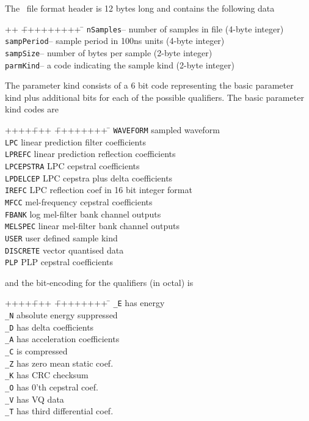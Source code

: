The \HTK\ file format header is 12 bytes long and contains the following data 
\begin{tabbing}
++ \= +++++++++ \= \kill
\>\texttt{nSamples}\>-- number of samples in file (4-byte integer) \\
\>\texttt{sampPeriod}\>-- sample period in 100ns units (4-byte integer) \\
\>\texttt{sampSize}\>-- number of bytes per sample (2-byte integer) \\
\>\texttt{parmKind}\>-- a code indicating the sample kind (2-byte integer)
\end{tabbing}
The parameter kind consists of a 6 bit
code representing the basic parameter kind plus additional bits for
each of the possible qualifiers.  The basic parameter kind codes are
\begin{tabbing}
++++\= +++ \= ++++++++ \=   \kill
{} \> \texttt{WAVEFORM} \> sampled waveform \\
 \> \texttt{LPC} \> linear prediction filter coefficients \\
 \> \texttt{LPREFC} \> linear prediction reflection coefficients \\
 \> \texttt{LPCEPSTRA} \> LPC cepstral coefficients \\
 \> \texttt{LPDELCEP}  \> LPC cepstra plus delta coefficients \\
 \> \texttt{IREFC}       \> LPC reflection coef in 16 bit integer format  \\
 \> \texttt{MFCC}      \> mel-frequency cepstral coefficients \\
 \> \texttt{FBANK}     \> log mel-filter bank channel outputs \\
 \> \texttt{MELSPEC}     \> linear mel-filter bank channel outputs \\
 \> \texttt{USER}      \> user defined sample kind \\
 \> \texttt{DISCRETE} \> vector quantised data \\
 \> \texttt{PLP}     \> PLP cepstral coefficients \\
\end{tabbing}
and the bit-encoding for the qualifiers (in octal) is 
\begin{tabbing}
++++\= +++ \= ++++++++ \=   \kill
\>\texttt{\_E}  \> has energy \\
\>\texttt{\_N}  \> absolute energy suppressed \\
\>\texttt{\_D}  \> has delta coefficients \\
\>\texttt{\_A}  \> has acceleration coefficients\\
\>\texttt{\_C}  \> is compressed \\
\>\texttt{\_Z}  \> has zero mean static coef. \\
\>\texttt{\_K}  \> has CRC checksum \\
\>\texttt{\_O}  \> has 0'th cepstral coef. \\
\>\texttt{\_V}  \> has VQ data  \\
\>\texttt{\_T}  \> has third differential coef. \\
\end{tabbing}

